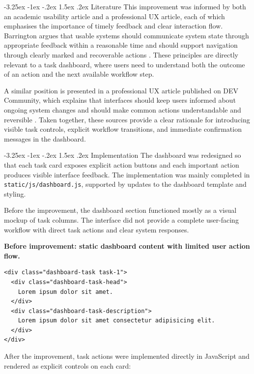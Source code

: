 \documentclass[12pt,a4paper]{article}
\makeatletter
\renewcommand\subsection{\@startsection{subsection}{2}{\z@}%
  {-3.25ex \@plus -1ex \@minus -.2ex}%
  {1.5ex \@plus .2ex}%
  {\normalfont\bfseries\fontsize{12}{14}\selectfont}}
\makeatother
\begin{document}
\subsection{Literature}
This improvement was informed by both an academic usability article and a professional UX article, each of which emphasises the importance of timely feedback and clear interaction flow. Barrington argues that usable systems should communicate system state through appropriate feedback within a reasonable time and should support navigation through clearly marked and recoverable actions \cite{barrington-usable-products}. These principles are directly relevant to a task dashboard, where users need to understand both the outcome of an action and the next available workflow step.

A similar position is presented in a professional UX article published on DEV Community, which explains that interfaces should keep users informed about ongoing system changes and should make common actions understandable and reversible \cite{devto-heuristics}. Taken together, these sources provide a clear rationale for introducing visible task controls, explicit workflow transitions, and immediate confirmation messages in the dashboard.

\subsection{Implementation}
The dashboard was redesigned so that each task card exposes explicit action buttons and each important action produces visible interface feedback. The implementation was mainly completed in \texttt{static/js/dashboard.js}, supported by updates to the dashboard template and styling.

Before the improvement, the dashboard section functioned mostly as a visual mockup of task columns. The interface did not provide a complete user-facing workflow with direct task actions and clear system responses.

\noindent\textbf{Before improvement: static dashboard content with limited user action flow.}
{\footnotesize
\begin{verbatim}
<div class="dashboard-task task-1">
  <div class="dashboard-task-head">
    Lorem ipsum dolor sit amet.
  </div>
  <div class="dashboard-task-description">
    Lorem ipsum dolor sit amet consectetur adipisicing elit.
  </div>
</div>
\end{verbatim}
}

After the improvement, task actions were implemented directly in JavaScript and rendered as explicit controls on each card:
\end{document}
